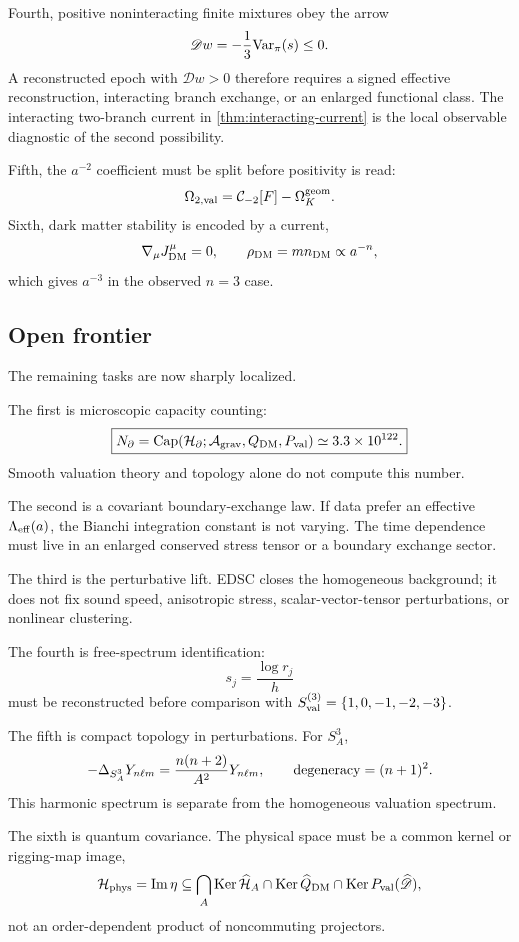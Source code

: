 \documentclass[aps,prd,reprint,nofootinbib,superscriptaddress]{revtex4-2}
\numberwithin{equation}{section}
\theoremstyle{definition}
\theoremstyle{plain}
\newcommand{\Dil}{\mathscr D}
\newcommand{\Agrav}{\mathcal A_{\rm grav}}
\newcommand{\Hphys}{\mathcal H_{\rm phys}}
\newcommand{\Hbd}{\mathcal H_{\partial}}
\newcommand{\Capacity}{\operatorname{Cap}}
\begin{document}
Fourth, positive noninteracting finite mixtures obey the arrow
\[
\Dil w=-\frac13{\rm Var}_\pi(s)\le0.
\]
A reconstructed epoch with \(\Dil w>0\) therefore requires a signed
effective reconstruction, interacting branch exchange, or an enlarged
functional class.  The interacting two-branch current in
\cref{thm:interacting-current} is the local observable diagnostic of the
second possibility.

Fifth, the \(a^{-2}\) coefficient must be split before positivity is read:
\[
\Omega_{2,{\rm val}}=\mathcal C_{-2}[F]-\Omega_K^{\rm geom}.
\]
Sixth, dark matter stability is encoded by a current,
\[
\nabla_\mu J^\mu_{\rm DM}=0,\qquad
\rho_{\rm DM}=m n_{\rm DM}\propto a^{-n},
\]
which gives \(a^{-3}\) in the observed \(n=3\) case.

\subsection{Open frontier}

The remaining tasks are now sharply localized.

The first is microscopic capacity counting:
\begin{equation}
\boxed{
N_\partial
=
\Capacity(\Hbd;\Agrav,Q_{\rm DM},P_{\rm val})
\simeq 3.3\times10^{122}.
}
\end{equation}
Smooth valuation theory and topology alone do not compute this number.

The second is a covariant boundary-exchange law.  If data prefer an
effective \(\Lambda_{\rm eff}(a)\), the Bianchi integration constant is not
varying.  The time dependence must live in an enlarged conserved
stress tensor or a boundary exchange sector.

The third is the perturbative lift.  EDSC closes the homogeneous background;
it does not fix sound speed, anisotropic stress, scalar-vector-tensor
perturbations, or nonlinear clustering.

The fourth is free-spectrum identification:
\[
s_j=\frac{\log r_j}{h}
\]
must be reconstructed before comparison with
\(S_{\rm val}^{(3)}=\{1,0,-1,-2,-3\}\).

The fifth is compact topology in perturbations.  For \(S^3_A\),
\[
-\Delta_{S^3_A}Y_{n\ell m}
=
\frac{n(n+2)}{A^2}Y_{n\ell m},
\qquad
{\rm degeneracy}=(n+1)^2 .
\]
This harmonic spectrum is separate from the homogeneous valuation spectrum.

The sixth is quantum covariance.  The physical space must be a common kernel
or rigging-map image,
\[
\Hphys={\rm Im}\,\eta
\subseteq
\bigcap_A{\rm Ker}\,\widehat{\mathcal H}_A
\cap{\rm Ker}\,\widehat Q_{\rm DM}
\cap{\rm Ker}\,P_{\rm val}(\widehat{\Dil}) ,
\]
not an order-dependent product of noncommuting projectors.
\end{document}
